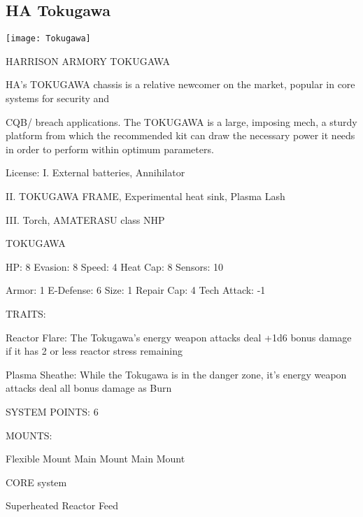 \subsection{HA Tokugawa}

\begin{center}
    \texttt{[image: Tokugawa]}
\end{center}

                             HARRISON ARMORY TOKUGAWA

HA’s TOKUGAWA chassis is a relative newcomer on the market, popular in core systems for security and

CQB/ breach applications. The TOKUGAWA is a large, imposing mech, a sturdy platform from which the
recommended kit can draw the necessary power it needs in order to perform within optimum parameters.

                                                  License:
I. External batteries, Annihilator

II. TOKUGAWA FRAME, Experimental heat sink, Plasma Lash

III. Torch, AMATERASU class NHP





                                                    TOKUGAWA

  HP: 8            Evasion: 8                              Speed: 4             Heat Cap: 8         Sensors: 10

  Armor: 1         E-Defense: 6                            Size: 1              Repair Cap: 4       Tech Attack: -1

                                                        TRAITS:

  Reactor Flare: The Tokugawa’s energy weapon attacks deal +1d6 bonus damage if it has 2 or less
  reactor stress remaining

  Plasma Sheathe: While the Tokugawa is in the danger zone, it’s energy weapon attacks deal all bonus
  damage as Burn

                                                 SYSTEM POINTS: 6

                                                       MOUNTS:

  Flexible Mount                       Main Mount                               Main Mount

                                                    CORE system

                                             Superheated Reactor Feed

